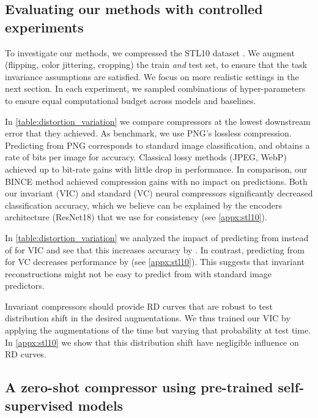 \documentclass[final]{article}
\begin{document}
\subsection{Evaluating our methods with controlled experiments}
To investigate our methods, we compressed the STL10 dataset \cite{coates_analysis_2011}.
We augment (flipping, color jittering, cropping) the train \textit{and} test set, to ensure that the task invariance assumptions are satisfied.
We focus on more realistic settings in the next section.
In each experiment, we sampled  combinations of hyper-parameters to ensure equal computational budget across models and baselines.






In \cref{table:distortion_variation} we compare compressors at the lowest downstream error that they achieved.
As benchmark, we use PNG's lossless compression.
Predicting from PNG corresponds to standard image classification, and obtains a rate of  bits per image for  accuracy.
Classical lossy methods (JPEG, WebP) achieved up to  bit-rate gains with little drop in performance.
In comparison, our BINCE method achieved   compression gains with no impact on predictions.
Both our invariant (VIC) and standard (VC) neural compressors significantly decreased classification accuracy, which we believe can be explained by the encoders architecture (ResNet18) that we use for consistency (see \cref{appx:stl10}).


In \cref{table:distortion_variation} we analyzed the impact of predicting from  instead of  for VIC and see that this increases accuracy by . 
In contrast, predicting from  for VC decreases performance by  (see \cref{appx:stl10}).
This suggests that invariant reconstructions  might not be easy to predict from with standard image predictors.


Invariant compressors should provide RD curves that are robust to test distribution shift in the desired augmentations.
We thus trained our VIC by applying the augmentations  of the time but varying that probability  at test time.
In \cref{appx:stl10} we show that this distribution shift have negligible influence on RD curves.





\subsection{A zero-shot compressor using pre-trained self-supervised models}
\label{sec:clip_experiments}
\end{document}
